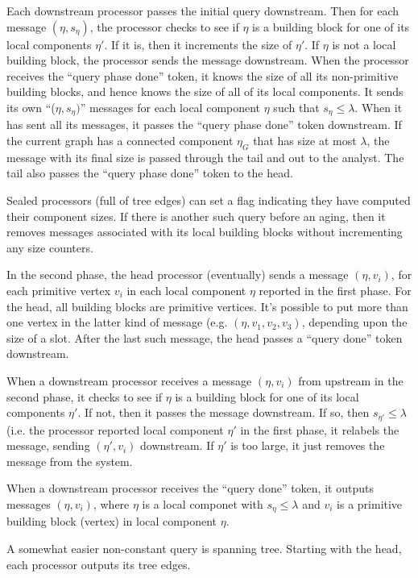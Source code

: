 Each downstream processor passes the initial query downstream.  Then
for each message $(\eta, s_{\eta})$, the processor checks to see if
$\eta$ is a building block for one of its local components $\eta'$.
If it is, then it increments the size of $\eta'$.  If $\eta$ is not a
local building block, the processor sends the message downstream.
When the processor receives the ``query phase done'' token, it knows
the size of all its non-primitive building blocks, and hence knows
the size of all of its local components.  It sends its own ``($\eta,
s_{\eta})$'' messages for each local component $\eta$ such that
$s_{\eta} \le \lambda$. When it has sent all its messages, it passes
the ``query phase done'' token downstream. If the current graph has a
connected component $\eta_G$ that has size at most $\lambda$, the
message with its final size is passed through the tail and out to the
analyst.  The tail also passes the ``query phase done'' token to the
head.

Sealed processors (full of tree edges) can set a flag indicating they
have computed their component sizes. If there is another such query
before an aging, then it removes messages associated with its local
building blocks without incrementing any size counters.

In the second phase, the head processor (eventually) sends a message
$(\eta, v_i)$, for each primitive vertex $v_i$ in each local component
$\eta$ reported in the first phase.  For the head, all building blocks
are primitive vertices. It's possible to put more than one vertex in
the latter kind of message (e.g. $(\eta, v_1, v_2, v_3)$, depending
upon the size of a slot.  After the last such message, the head passes
a ``query done'' token downstream.

When a downstream processor receives a message $(\eta, v_i)$ from
upstream in the second phase, it checks to see if $\eta$ is a building
block for one of its local components $\eta'$. If not, then it passes
the message downstream.  If so, then $s_{\eta'} \le \lambda$ (i.e. the processor
reported local component $\eta'$ in the first phase, it relabels the message,
sending $(\eta', v_i)$ downstream.  If $\eta'$ is too large, it just removes
the message from the system.

When a downstream processor receives the ``query done'' token, it outputs
messages $(\eta, v_i)$, where $\eta$ is a local componet with $s_{\eta} \le \lambda$
and $v_i$ is a primitive building block (vertex) in local component $\eta$.

A somewhat easier non-constant query is spanning tree. Starting with the head, each
processor outputs its tree edges.

